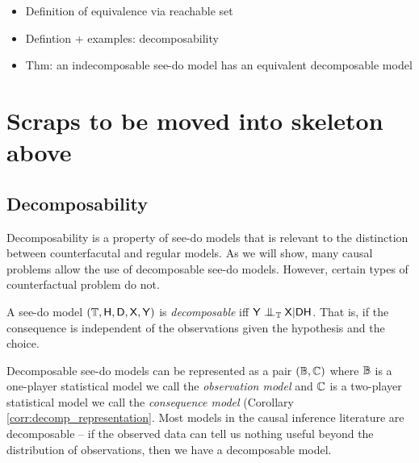 \begin{itemize}
    \item Definition of equivalence via reachable set
    \item Defintion + examples: decomposability
    \item Thm: an indecomposable see-do model has an equivalent decomposable model
\end{itemize}

\section{Scraps to be moved into skeleton above}

\subsection{Decomposability}

Decomposability is a property of see-do models that is relevant to the distinction between counterfacutal and regular models. As we will show, many causal problems allow the use of decomposable see-do models. However, certain types of counterfactual problem do not.

\begin{definition}[decomposability]\label{def:decomposability}
A see-do model $(\mathbb{T},\mathsf{H},\mathsf{D},\mathsf{X},\mathsf{Y})$ is \emph{decomposable} iff $\RV{Y}\CI_\kernel{T} \RV{X}|\RV{D}\RV{H}$. That is, if the consequence is independent of the observations given the hypothesis and the choice.
\end{definition}

Decomposable see-do models can be represented as a pair $(\mathbb{B},\mathbb{C})$ where $\mathbb{B}$ is a one-player statistical model we call the \emph{observation model} and $\mathbb{C}$ is a two-player statistical model we call the \emph{consequence model} (Corollary \ref{corr:decomp_representation}. Most models in the causal inference literature are decomposable -- if the observed data can tell us nothing useful beyond the distribution of observations, then we have a decomposable model.

